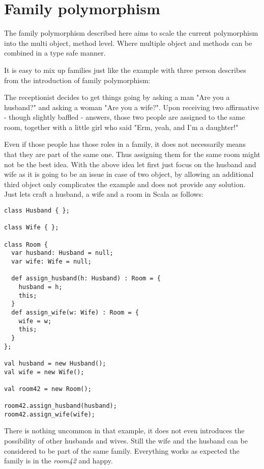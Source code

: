 \documentclass[a4paper, 10pt, conference ]{llncs}
\let\cite\parencite
\begin{document}
\section{Family polymorphism}

The family polymorphism described here aims to scale the current polymorphism into the multi object, method level. Where multiple object and methods can be combined in a type safe manner.

It is easy to mix up families just like the example with three person describes from the introduction of family polymorphism\cite{ernst2001family}:
\begin{displayquote}
The receptionist decides to get things going by asking a man "Are you a husband?" and asking a woman "Are you a wife?". Upon receiving two affirmative - though slightly baffled - answers, those two people are assigned to the same room, together with a little girl who said "Erm, yeah, and I'm a daughter!"
\end{displayquote}

Even if those people has those roles in a family, it does not necessarily means that they are part of the same one. Thus assigning them for the same room might not be the best idea. With the above idea let first just focus on the husband and wife as it is going to be an issue in case of two object, by allowing an additional third object only complicates the example and does not provide any solution. Just lets craft a husband, a wife and a room in Scala as follows:
\begin{verbatim}
class Husband { };

class Wife { };

class Room {
  var husband: Husband = null;
  var wife: Wife = null;

  def assign_husband(h: Husband) : Room = {
    husband = h;
    this;
  }
  def assign_wife(w: Wife) : Room = {
    wife = w;
    this;
  }
};

val husband = new Husband();
val wife = new Wife();

val room42 = new Room();

room42.assign_husband(husband);
room42.assign_wife(wife);
\end{verbatim}
There is nothing uncommon in that example, it does not even introduces the possibility of other husbands and wives. Still the wife and the husband can be considered to be part of the same family. Everything works as expected the family is in the \emph{room42} and happy.
\end{document}
